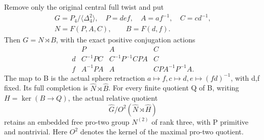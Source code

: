 Remove only the original central full twist and put
\[
\begin{gathered}
 G=P_4/\langle\Delta_4^2\rangle,\quad P=def,
 \quad A=af^{-1},\quad C=cd^{-1},\\
 N=F(P,A,C),\qquad B=F(d,f).
\end{gathered}
\tag{A.96.1}
\]
Then \(G=N\rtimes B\), with the exact positive conjugation actions
\[
\begin{array}{c|ccc}
 &P&A&C\\ \hline
 d&C^{-1}PC&C^{-1}P^{-1}CPA&C\\
 f&A^{-1}PA&A&CPA^{-1}P^{-1}A.
\end{array}
\tag{A.96.2}
\]
The map to B is the actual sphere retraction
\(a\mapsto f,c\mapsto d,e\mapsto(fd)^{-1}\), with d,f fixed.
Its full completion is \(\widehat N\rtimes\widehat B\).
For every finite quotient Q of B, writing \(H=\ker(B\to Q)\),
the actual relative quotient
\[
 \widehat G/O^2(\widehat N\rtimes\widehat H)
 \tag{A.96.3}
\]
retains an embedded free pro-two group \(N^{(2)}\) of rank three,
with P primitive and nontrivial. Here \(O^2\) denotes the kernel
of the maximal pro-two quotient.

